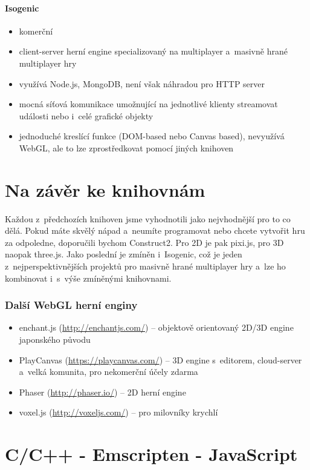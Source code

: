 \documentclass[12pt,a4paper,titlepage,final]{report}
\begin{document}
\paragraph{Isogenic} \cite{isogenic}

\begin{itemize}
	\item komerční
	\item client-server herní engine specializovaný na multiplayer a~masivně hrané multiplayer hry
	\item využívá Node.js, MongoDB, není však náhradou pro HTTP server
	\item mocná síťová komunikace umožnující na jednotlivé klienty streamovat události nebo i~celé grafické objekty
	\item jednoduché kreslící funkce (DOM-based nebo Canvas based), nevyužívá WebGL, ale to lze zprostředkovat pomocí jiných knihoven
\end{itemize}

\section{Na závěr ke knihovnám}

Každou z~předchozích knihoven jsme vyhodnotili jako nejvhodnější pro to co dělá. Pokud máte skvělý nápad a~neumíte programovat nebo chcete vytvořit hru za odpoledne, doporučili bychom Construct2. Pro 2D je pak pixi.js, pro 3D naopak three.js. Jako poslední je zmíněn i~Isogenic, což je jeden z~nejperspektivnějších projektů pro masivně hrané multiplayer hry a~lze ho kombinovat i~s~výše zmíněnými knihovnami.

\subsubsection{Další WebGL herní enginy}
\begin{itemize}
	\item enchant.js (\url{http://enchantjs.com/}) -- objektově orientovaný 2D/3D engine japonského původu
	\item PlayCanvas (\url{https://playcanvas.com/}) -- 3D engine s~editorem, cloud-server a~velká komunita, pro nekomerční účely zdarma
	\item Phaser (\url{http://phaser.io/}) -- 2D herní engine
	\item voxel.js (\url{http://voxeljs.com/}) -- pro milovníky krychlí
\end{itemize}

\section{C/C++ - Emscripten - JavaScript}
\end{document}
